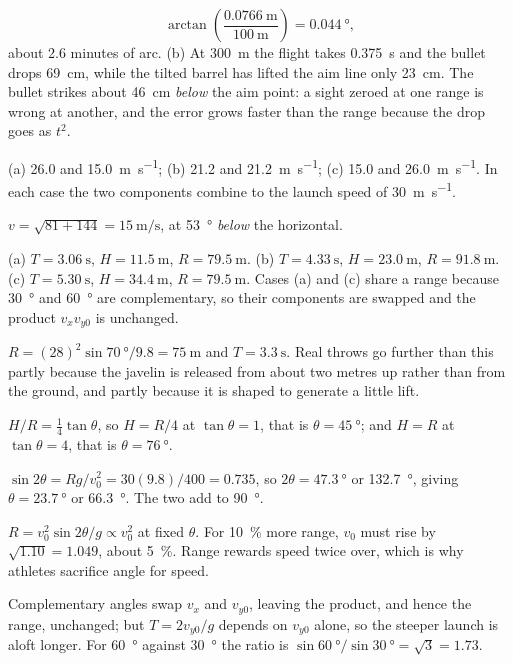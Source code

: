 \documentclass[11pt,twoside,openany]{book}
\begin{document}
\begin{description}[leftmargin=2.6em,itemsep=3pt,style=sameline]
  \[
  \arctan\!\left(\frac{\SI{0.0766}{\metre}}{\SI{100}{\metre}}\right) = \SI{0.044}{\degree},
  \]
  about \num{2.6} minutes of arc. (b) At \SI{300}{\metre} the flight takes \SI{0.375}{\second} and the bullet drops \SI{69}{\centi\metre}, while the tilted barrel has lifted the aim line only \SI{23}{\centi\metre}. The bullet strikes about \SI{46}{\centi\metre} \emph{below} the aim point: a sight zeroed at one range is wrong at another, and the error grows faster than the range because the drop goes as $t^2$.
  \item[3.30] (a) \SI{26.0}{} and \SI{15.0}{\metre\per\second}; (b) \SI{21.2}{} and \SI{21.2}{\metre\per\second}; (c) \SI{15.0}{} and \SI{26.0}{\metre\per\second}. In each case the two components combine to the launch speed of \SI{30}{\metre\per\second}.
  \item[3.31] $v = \sqrt{81+144} = \SI{15}{\metre\per\second}$, at \SI{53}{\degree} \emph{below} the horizontal.
  \item[3.32] (a) $T = \SI{3.06}{\second}$, $H = \SI{11.5}{\metre}$, $R = \SI{79.5}{\metre}$. (b) $T = \SI{4.33}{\second}$, $H = \SI{23.0}{\metre}$, $R = \SI{91.8}{\metre}$. (c) $T = \SI{5.30}{\second}$, $H = \SI{34.4}{\metre}$, $R = \SI{79.5}{\metre}$. Cases (a) and (c) share a range because \SI{30}{\degree} and \SI{60}{\degree} are complementary, so their components are swapped and the product $v_xv_{y0}$ is unchanged.
  \item[3.33] $R = (28)^2\sin\SI{70}{\degree}/9.8 = \SI{75}{\metre}$ and $T = \SI{3.3}{\second}$. Real throws go further than this partly because the javelin is released from about two metres up rather than from the ground, and partly because it is shaped to generate a little lift.
  \item[3.34] $H/R = \tfrac14\tan\theta$, so $H = R/4$ at $\tan\theta = 1$, that is $\theta = \SI{45}{\degree}$; and $H = R$ at $\tan\theta = 4$, that is $\theta = \SI{76}{\degree}$.
  \item[3.35] $\sin2\theta = Rg/v_0^2 = 30(9.8)/400 = \num{0.735}$, so $2\theta = \SI{47.3}{\degree}$ or \SI{132.7}{\degree}, giving $\theta = \SI{23.7}{\degree}$ or \SI{66.3}{\degree}. The two add to \SI{90}{\degree}.
  \item[3.36] $R = v_0^2\sin2\theta/g \propto v_0^2$ at fixed $\theta$. For \SI{10}{\percent} more range, $v_0$ must rise by $\sqrt{1.10} = \num{1.049}$, about \SI{5}{\percent}. Range rewards speed twice over, which is why athletes sacrifice angle for speed.
  \item[3.37] Complementary angles swap $v_x$ and $v_{y0}$, leaving the product, and hence the range, unchanged; but $T = 2v_{y0}/g$ depends on $v_{y0}$ alone, so the steeper launch is aloft longer. For \SI{60}{\degree} against \SI{30}{\degree} the ratio is $\sin\SI{60}{\degree}/\sin\SI{30}{\degree} = \sqrt3 = \num{1.73}$.

\end{description}
\end{document}
